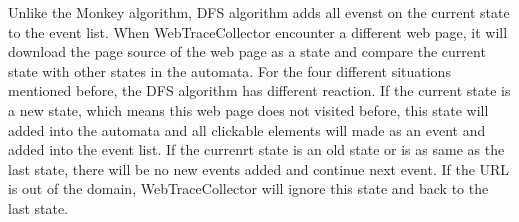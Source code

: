Unlike the Monkey algorithm, DFS algorithm adds all evenst on the current state to the event list.
When WebTraceCollector encounter a different web page,
it will download the page source of the web page as a state and compare the current state with other states in the automata.
For the four different situations mentioned before,
the DFS algorithm has different reaction.
If the current state is a new state, which means this web page does not visited before,
this state will added into the automata and all clickable elements will made as an event and added into the event list.
If the currenrt state is an old state or is as same as the last state,
there will be no new events added and continue next event.
If the URL is out of the domain, WebTraceCollector will ignore this state and back to the last state.

\clearpage

